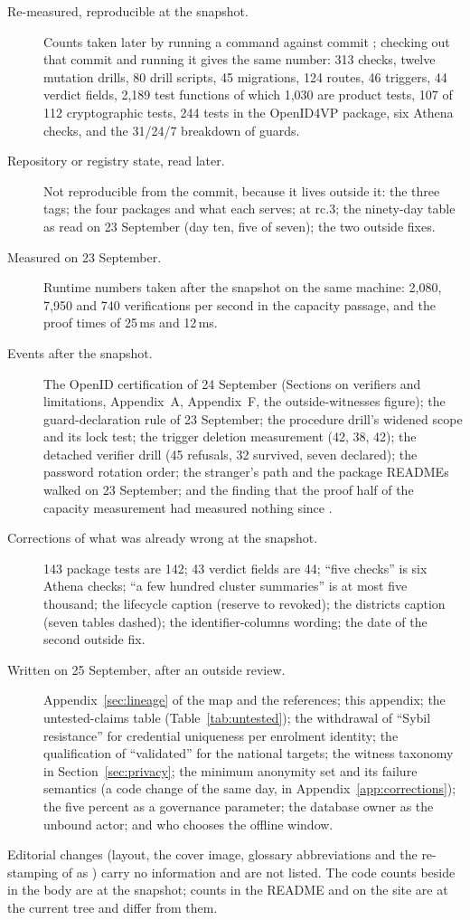 \begin{description}
  \item[Re-measured, reproducible at the snapshot.] Counts taken later by running a command against
    commit ; checking out that commit and running it gives the same number: 313
    checks, twelve mutation drills, 80 drill scripts, 45 migrations, 124 routes, 46 triggers, 44
    verdict fields, 2{,}189 test functions of which 1{,}030 are product tests, 107 of 112
    cryptographic tests, 244 tests in the OpenID4VP package, six Athena checks, and the 31/24/7
    breakdown of guards.
  \item[Repository or registry state, read later.] Not reproducible from the commit, because it
    lives outside it: the three tags; the four packages and what each serves; 
    at rc.3; the ninety-day table as read on 23 September (day ten, five of seven); the two outside
    fixes.
  \item[Measured on 23 September.] Runtime numbers taken after the snapshot on the same machine:
    2{,}080, 7{,}950 and 740 verifications per second in the capacity passage, and the proof times of
    25\,ms and 12\,ms.
  \item[Events after the snapshot.] The OpenID certification of 24 September (Sections on verifiers
    and limitations, Appendix~A, Appendix~F, the outside-witnesses figure); the guard-declaration
    rule of 23 September; the procedure drill's widened scope and its lock test; the trigger
    deletion measurement (42, 38, 42); the detached verifier drill (45 refusals, 32 survived, seven
    declared); the password rotation order; the stranger's path and the package READMEs walked on
    23 September; and the finding that the proof half of the capacity measurement had measured
    nothing since .
  \item[Corrections of what was already wrong at the snapshot.] 143 package tests are 142; 43
    verdict fields are 44; ``five checks'' is six Athena checks; ``a few hundred cluster
    summaries'' is at most five thousand; the lifecycle caption (reserve to revoked); the districts
    caption (seven tables dashed); the identifier-columns wording; the date of the second outside fix.
  \item[Written on 25 September, after an outside review.] Appendix~\ref{sec:lineage} of the map and the
    references; this appendix; the untested-claims table (Table~\ref{tab:untested}); the withdrawal
    of ``Sybil resistance'' for credential uniqueness per enrolment identity; the qualification of
    ``validated'' for the national targets; the witness taxonomy in Section~\ref{sec:privacy}; the
    minimum anonymity set and its failure semantics (a code change of the same day, in Appendix~\ref{app:corrections});
    the five percent as a governance parameter; the database owner as the unbound actor; and who
    chooses the offline window.
\end{description}

Editorial changes (layout, the cover image, glossary abbreviations and the re-stamping of
 as ) carry no information and are not listed. The code counts beside
 in the body are at the snapshot; counts in the README and on the site are at the
current tree and differ from them.
